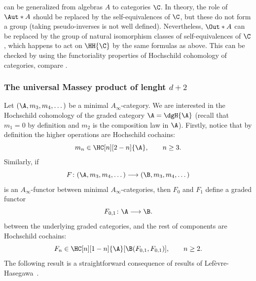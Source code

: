 \documentclass[a4paper]{amsart}
\begin{document}
\begin{remark}
	 can be generalized from algebras $A$ to  categories $\C$. In theory, the role of $\Aut*{A}$ should be replaced by the self-equivalences of $\C$, but these do not form a group (taking pseudo-inverses is not well defined). Nevertheless, $\Out*{A}$ can be replaced by the group of natural isomorphism classes of self-equivalences of $\C$, which happens to act on $\HH{\C}$ by the same formulas as above. This can be checked by using the functoriality properties of Hochschild cohomology of categories, compare \cite{Mur06}.
\end{remark}


\subsubsection{The universal Massey product of lenght $d+2$}

Let $(\A,m_3,m_4,\dots)$ be a minimal $A_\infty$-category. We are interested in
the Hochschild cohomology of the graded category $\A=\dgH{\A}$ (recall that
$m_1=0$ by definition and $m_2$ is the composition law in $\A$). Firstly, notice
that by definition the higher operations are Hochschild cochains:
\[
  m_n\in\HC[n][2-n]{\A},\qquad n\geq 3.
\]
Similarly, if
\[
  F\colon(\A,m_3,m_4,\dots)\longrightarrow(\B,m_3,m_4,\dots)
\]
is an $A_\infty$-functor between minimal $A_\infty$-categories, then $F_0$ and
$F_1$ define a graded functor
\[
  F_{0,1}\colon\A\longrightarrow\B.
\]
between the underlying graded categories, and the rest of components are
Hochschild cochains:
\[
  F_n\in\HC[n][1-n]{\A}[\B(F_{0,1},F_{0,1})],\qquad n\geq 2.
\]
The following result is a straightforward consequence of results of
Lef{\`e}vre-\-Ha\-se\-ga\-wa~\cite{Lef03}.
\end{document}
